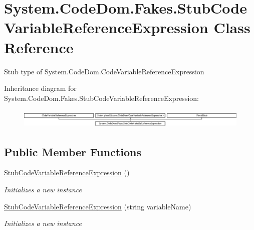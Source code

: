 \hypertarget{class_system_1_1_code_dom_1_1_fakes_1_1_stub_code_variable_reference_expression}{\section{System.\-Code\-Dom.\-Fakes.\-Stub\-Code\-Variable\-Reference\-Expression Class Reference}
\label{class_system_1_1_code_dom_1_1_fakes_1_1_stub_code_variable_reference_expression}
}


Stub type of System.\-Code\-Dom.\-Code\-Variable\-Reference\-Expression 


Inheritance diagram for System.\-Code\-Dom.\-Fakes.\-Stub\-Code\-Variable\-Reference\-Expression\-:\begin{figure}[H]
\begin{center}
\leavevmode
\includegraphics[height=0.906149cm]{class_system_1_1_code_dom_1_1_fakes_1_1_stub_code_variable_reference_expression}
\end{center}
\end{figure}
\subsection*{Public Member Functions}
\begin{DoxyCompactItemize}
\item 
\hyperlink{class_system_1_1_code_dom_1_1_fakes_1_1_stub_code_variable_reference_expression_a28a908e21561583ff891aa2746ba71fd}{Stub\-Code\-Variable\-Reference\-Expression} ()
\begin{DoxyCompactList}\small\item\em Initializes a new instance\end{DoxyCompactList}\item 
\hyperlink{class_system_1_1_code_dom_1_1_fakes_1_1_stub_code_variable_reference_expression_a077ee9075fd3d0dd1e3821aec5343805}{Stub\-Code\-Variable\-Reference\-Expression} (string variable\-Name)
\begin{DoxyCompactList}\small\item\em Initializes a new instance\end{DoxyCompactList}\end{DoxyCompactItemize}
